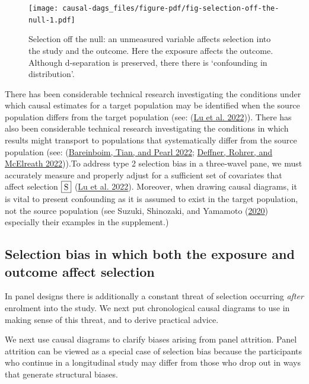\documentclass[
  singlecolumn]{report}
\begin{document}
\begin{figure}

{\centering \texttt{[image: causal-dags\_files/figure-pdf/fig-selection-off-the-null-1.pdf]}

}

\caption{\label{fig-selection-off-the-null}Selection off the null: an
unmeasured variable affects selection into the study and the outcome.
Here the exposure affects the outcome. Although d-separation is
preserved, there there is `confounding in distribution'.}

\end{figure}

There has been considerable technical research investigating the
conditions under which causal estimates for a target population may be
identified when the source population differs from the target population
(see: (\protect\hyperlink{ref-lu2022}{Lu et al. 2022})). There has also
been considerable technical research investigating the conditions in
which results might transport to populations that systematically differ
from the source population (see:
(\protect\hyperlink{ref-bareinboim2022}{Bareinboim, Tian, and Pearl
2022}; \protect\hyperlink{ref-deffner2022}{Deffner, Rohrer, and
McElreath 2022})).To address type 2 selection bias in a three-wavel
pane, we must accurately measure and properly adjust for a sufficient
set of covariates that affect selection \(\framebox{S}\)
(\protect\hyperlink{ref-lu2022}{Lu et al. 2022}). Moreover, when drawing
causal diagrams, it is vital to present confounding as it is assumed to
exist in the target population, not the source population (see Suzuki,
Shinozaki, and Yamamoto (\protect\hyperlink{ref-suzuki2020}{2020})
especially their examples in the supplement.)

\hypertarget{selection-bias-in-which-both-the-exposure-and-outcome-affect-selection}{%
\subsection{Selection bias in which both the exposure and outcome affect
selection}\label{selection-bias-in-which-both-the-exposure-and-outcome-affect-selection}}

In panel designs there is additionally a constant threat of selection
occurring \emph{after} enrolment into the study. We next put
chronological causal diagrams to use in making sense of this threat, and
to derive practical advice.

We next use causal diagrams to clarify biases arising from panel
attrition. Panel attrition can be viewed as a special case of selection
bias because the participants who continue in a longitudinal study may
differ from those who drop out in ways that generate structural biases.
\end{document}
